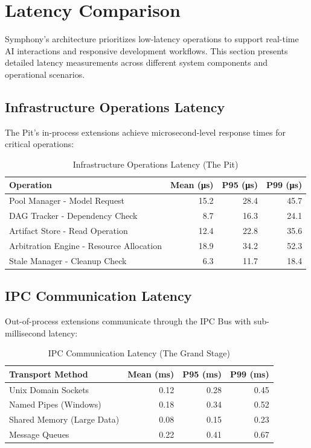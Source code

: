 \section*{Latency Comparison}

Symphony's architecture prioritizes low-latency operations to support real-time AI interactions and responsive development workflows. This section presents detailed latency measurements across different system components and operational scenarios.

\subsection*{Infrastructure Operations Latency}

The Pit's in-process extensions achieve microsecond-level response times for critical operations:

\begin{table}[ht]
\centering
\caption{Infrastructure Operations Latency (The Pit)}
\label{tab:pit-latency}
\begin{tabular}{@{}lrrr@{}}
\toprule
\textbf{Operation} & \textbf{Mean (μs)} & \textbf{P95 (μs)} & \textbf{P99 (μs)} \\
\midrule
Pool Manager - Model Request & 15.2 & 28.4 & 45.7 \\
DAG Tracker - Dependency Check & 8.7 & 16.3 & 24.1 \\
Artifact Store - Read Operation & 12.4 & 22.8 & 35.6 \\
Arbitration Engine - Resource Allocation & 18.9 & 34.2 & 52.3 \\
Stale Manager - Cleanup Check & 6.3 & 11.7 & 18.4 \\
\bottomrule
\end{tabular}
\end{table}

\subsection*{IPC Communication Latency}

Out-of-process extensions communicate through the IPC Bus with sub-millisecond latency:

\begin{table}[ht]
\centering
\caption{IPC Communication Latency (The Grand Stage)}
\label{tab:ipc-latency}
\begin{tabular}{@{}lrrr@{}}
\toprule
\textbf{Transport Method} & \textbf{Mean (ms)} & \textbf{P95 (ms)} & \textbf{P99 (ms)} \\
\midrule
Unix Domain Sockets & 0.12 & 0.28 & 0.45 \\
Named Pipes (Windows) & 0.18 & 0.34 & 0.52 \\
Shared Memory (Large Data) & 0.08 & 0.15 & 0.23 \\
Message Queues & 0.22 & 0.41 & 0.67 \\
\bottomrule
\end{tabular}
\end{table}

